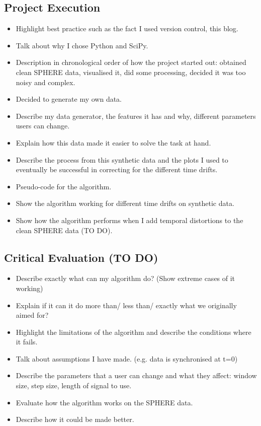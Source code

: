 \documentclass{article}
\begin{document}
\subsection{Project Execution}
\begin{itemize}
\item Highlight best practice such as the fact I used version control, this blog.
\item Talk about why I chose Python and SciPy.
\item Description in chronological order of how the project started out: obtained clean SPHERE data, visualised it, did some processing, decided it was too noisy and complex.
\item Decided to generate my own data.
\item Describe my data generator, the features it has and why, different parameters users can change.
\item Explain how this data made it easier to solve the task at hand.
\item Describe the process from this synthetic data and the plots I used to eventually be successful in correcting for the different time drifts.
\item Pseudo-code for the algorithm.
\item Show the algorithm working for different time drifts on synthetic data.
\item Show how the algorithm performs when I add temporal distortions to the clean SPHERE data (TO DO).
\end{itemize}


\subsection{Critical Evaluation (TO DO)}
\begin{itemize}
\item Describe exactly what can my algorithm do? (Show extreme cases of it working)
\item Explain if it can it do more than/ less than/ exactly what we originally aimed for?
\item Highlight the limitations of the algorithm and describe the conditions where it fails.
\item Talk about assumptions I have made. (e.g. data is synchronised at t=0)
\item Describe the parameters that a user can change and what they affect: window size, step size, length of signal to use.
\item Evaluate how the algorithm works on the SPHERE data.
\item Describe how it could be made better.
\end{itemize}
  
\end{document}
